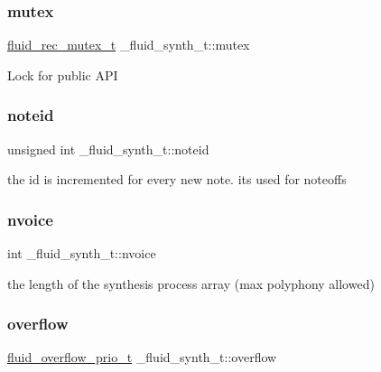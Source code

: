 \subsubsection{\texorpdfstring{mutex}{mutex}}
{\footnotesize\ttfamily \hyperlink{fluid__sys_8h_a8e5bc2095bf6a26aa487db766bfb6660}{fluid\+\_\+rec\+\_\+mutex\+\_\+t} \+\_\+fluid\+\_\+synth\+\_\+t\+::mutex}

Lock for public A\+PI \mbox{\label{struct__fluid__synth__t_a77619d68603d1da8030796a8c6f6325e}} 
\subsubsection{\texorpdfstring{noteid}{noteid}}
{\footnotesize\ttfamily unsigned int \+\_\+fluid\+\_\+synth\+\_\+t\+::noteid}

the id is incremented for every new note. it\textquotesingle{}s used for noteoff\textquotesingle{}s \mbox{\label{struct__fluid__synth__t_a4f14f2ed852384d1d9e0f7848300f9b3}} 
\subsubsection{\texorpdfstring{nvoice}{nvoice}}
{\footnotesize\ttfamily int \+\_\+fluid\+\_\+synth\+\_\+t\+::nvoice}

the length of the synthesis process array (max polyphony allowed) \mbox{\label{struct__fluid__synth__t_a2491ded83c4906c713d034911f6615d3}} 
\subsubsection{\texorpdfstring{overflow}{overflow}}
{\footnotesize\ttfamily \hyperlink{fluid__voice_8h_a1470e84ffede53a3181a35761e016101}{fluid\+\_\+overflow\+\_\+prio\+\_\+t} \+\_\+fluid\+\_\+synth\+\_\+t\+::overflow}

